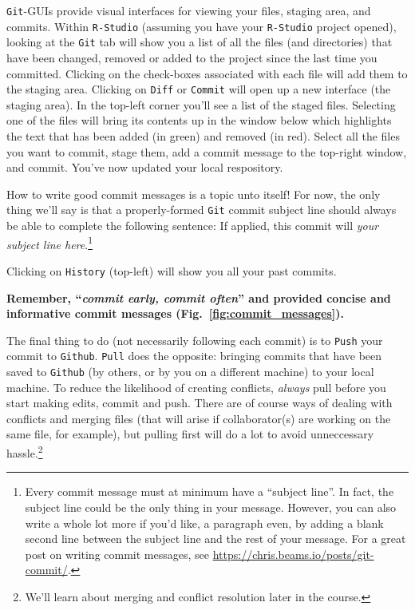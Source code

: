 \documentclass[12pt,letterpaper]{article}
\begin{document}
\texttt{Git}-GUIs provide visual interfaces for viewing your files, staging area, and commits.
Within \texttt{R-Studio} (assuming you have your \texttt{R-Studio} project opened), looking at the \texttt{Git} tab will show you a list of all the files (and directories) that have been changed, removed or added to the project since the last time you committed.
Clicking on the check-boxes associated with each file will add them to the staging area.
Clicking on \texttt{Diff} or \texttt{Commit} will open up a new interface (the staging area).
In the top-left corner you'll see a list of the staged files.
Selecting one of the files will bring its contents up in the window below which highlights the text that has been added (in green) and removed (in red).
Select all the files you want to commit, stage them, add a commit message to the top-right window, and commit.
You've now updated your local respository.

How to write good commit messages is a topic unto itself!  For now, the only thing we'll say is that a properly-formed \texttt{Git} commit subject line should always be able to complete the following sentence:  If applied, this commit will \emph{your subject line here}.\footnote{Every commit message must at minimum have a ``subject line''.  In fact, the subject line could be the only thing in your message.  However, you can also write a whole lot more if you'd like, a paragraph even, by adding a blank second line between the subject line and the rest of your message.  For a great post on writing commit messages, see \url{https://chris.beams.io/posts/git-commit/}.}

Clicking on \texttt{History} (top-left) will show you all your past commits.

\textbf{Remember, ``\emph{commit early, commit often}'' and provided concise and informative commit messages (Fig.~\ref{fig:commit_messages}).}

The final thing to do (not necessarily following each commit) is to \texttt{Push} your commit to \texttt{Github}.
\texttt{Pull} does the opposite: bringing commits that have been saved to \texttt{Github} (by others, or by you on a different machine) to your local machine.
To reduce the likelihood of creating conflicts, \emph{always} pull before you start making edits, commit and push.
There are of course ways of dealing with conflicts and merging files (that will arise if collaborator(s) are working on the same file, for example), but pulling first will do a lot to avoid unneccessary hassle.\footnote{We'll learn about merging and conflict resolution later in the course.}
\end{document}
